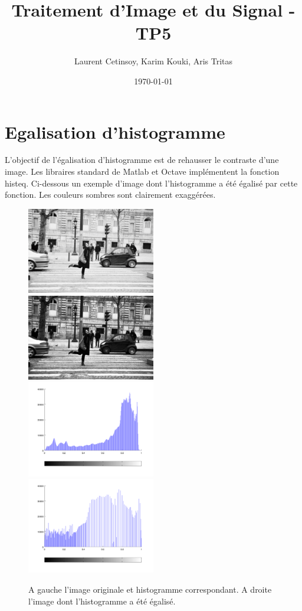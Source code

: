 \documentclass{article}
\title{Traitement d'Image et du Signal - TP5}
\author{Laurent Cetinsoy, Karim Kouki, Aris Tritas }
\date{\today}
\begin{document}
\maketitle

\section{Egalisation d'histogramme}
L'objectif de l'égalisation d'histogramme est de rehausser le contraste d'une image. Les libraires standard de Matlab et Octave implémentent la fonction \textsf{histeq}. Ci-dessous un exemple d'image dont l'histogramme a été égalisé par cette fonction. Les couleurs sombres sont clairement exaggérées.

\begin{figure}[h]
	\includegraphics[width=0.5\textwidth]{P11.jpg}
	\includegraphics[width=0.5\textwidth]{P11eq.png}
	\newline
	\includegraphics[width=0.5\textwidth]{hist_p11.png}
	\includegraphics[width=0.5\textwidth]{hist_p11eq.png}
  \caption{A gauche l'image originale et histogramme correspondant. A droite l'image dont l'histogramme a été égalisé. }
\end{figure}
\end{document}
